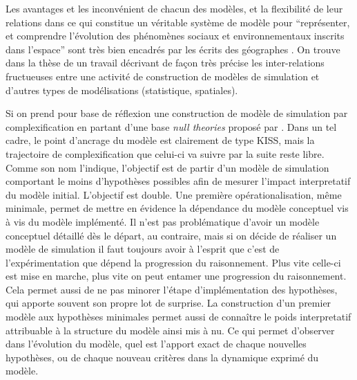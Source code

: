 Les avantages et les inconvénient de chacun des modèles, et la flexibilité de leur relations dans ce qui constitue un véritable système de modèle pour \enquote{représenter, et comprendre l'évolution des phénomènes sociaux et environnementaux inscrits dans l'espace} sont très bien encadrés par les écrits des géographes \textcites{Sanders2000, Mathian2014}. On trouve dans la thèse de \textcite{Cottineau2014a, Cottineau2014b} un travail décrivant de façon très précise les inter-relations fructueuses entre une activité de construction de modèles de simulation et d'autres types de modélisations (statistique, spatiales). 





Si on prend pour base de réflexion une construction de modèle de simulation par complexification en partant d'une base \textit{null theories} proposé par \autocite{Grimm2012}. Dans un tel cadre, le point d'ancrage du modèle est clairement de type KISS, mais la trajectoire de complexification que celui-ci va suivre par la suite reste libre. Comme son nom l'indique, l'objectif est de partir d'un modèle de simulation comportant le moins d'hypothèses possibles afin de mesurer l’impact interpretatif du modèle initial. L'objectif est double. Une première opérationalisation, même minimale, permet de mettre en évidence la dépendance du modèle conceptuel vis à vis du modèle implémenté. Il n'est pas problématique d'avoir un modèle conceptuel détaillé dès le départ, au contraire, mais si on décide de réaliser un modèle de simulation il faut toujours avoir à l'esprit que c'est de l'expérimentation que dépend la progression du raisonnement. Plus vite celle-ci est mise en marche, plus vite on peut entamer une progression du raisonnement. Cela permet aussi de ne pas minorer l'étape d'implémentation des hypothèses, qui apporte souvent son propre lot de surprise. La construction d'un premier modèle aux hypothèses minimales permet aussi de connaître le poids interpretatif attribuable à la structure du modèle ainsi mis à nu. Ce qui permet d’observer dans l’évolution du modèle, quel est l’apport exact de chaque nouvelles hypothèses, ou de chaque nouveau critères dans la dynamique exprimé du modèle.

